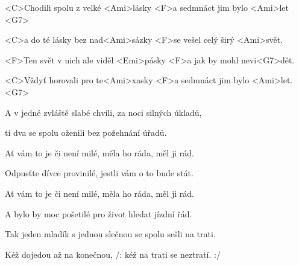 

\zs
<C>Chodili spolu z velké <Ami>lásky <F>a sedmnáct jim bylo <Ami>let <G7>

<C>a do té lásky bez nad<Ami>sázky <F>se vešel celý širý <Ami>svět.

<F>Ten svět v nich ale viděl <Emi>pásky <F>a jak by mohl nevi<G7>dět.

<C>Vždyť horovali pro te<Ami>xasky <F>a sedmnáct jim bylo <Ami>let. <G7>
\ks

\zs
A v jedné zvláště slabé chvíli, za noci silných úkladů,

ti dva se spolu oženili bez požehnání úřadů.

Ať vám to je či není milé, měla ho ráda, měl ji rád.

Odpusťte dívce provinilé, jestli vám o to bude stát.
\ks

\zs
Ať vám to je či není milé, měla ho ráda, měl ji rád.

A bylo by moc pošetilé pro život hledat jízdní řád.

Tak jeden mladík s jednou slečnou se spolu sešli na trati.

Kéž dojedou až na konečnou, /: kéž na trati se neztratí. :/
\ks

\kp
